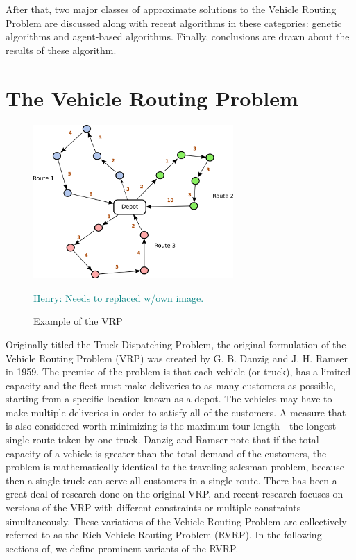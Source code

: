 \documentclass{sig-alternate}
\newcommand{\allcomments}[1]{{#1}}
\newcommand{\hfcomment}[1]{\textcolor{Teal}{\allcomments{Henry: {#1}}}}
\begin{document}
After that, two major classes of approximate solutions to the Vehicle Routing Problem are discussed along with recent algorithms in these categories: genetic algorithms and agent-based algorithms. Finally, conclusions are drawn about the results of these algorithm.

\section{The Vehicle Routing Problem}
\label{sec:VRP}

\begin{figure}
\centering
\includegraphics[width=3in, keepaspectratio]{vrp1.png}
\caption{Example of the VRP}
\hfcomment{Needs to replaced w/own image.}
\label{fig:VRPgraph}
\end{figure}

Originally titled the Truck Dispatching Problem, the original formulation of the Vehicle Routing Problem (VRP) was created by G. B. Danzig and J. H. Ramser in 1959\cite{Danzig:1959}. The premise of the problem is that each vehicle (or truck), has a limited capacity and the fleet must make deliveries to as many customers as possible, starting from a specific location known as a depot\cite{Caceres-Cruz:2014}. The vehicles may have to make multiple deliveries in order to satisfy all of the customers. A measure that is also considered worth minimizing is the maximum tour length - the longest single route taken by one truck. Danzig and Ramser note that if the total capacity of a vehicle is greater than the total demand of the customers, the problem is mathematically identical to the traveling salesman problem, because then a single truck can serve all customers in a single route. There has been a great deal of research done on the original VRP, and recent research focuses on versions of the VRP with different constraints or multiple constraints simultaneously. These variations of the Vehicle Routing Problem are collectively referred to as the Rich Vehicle Routing Problem (RVRP). In the following sections of, we define prominent variants of the RVRP.
\end{document}
